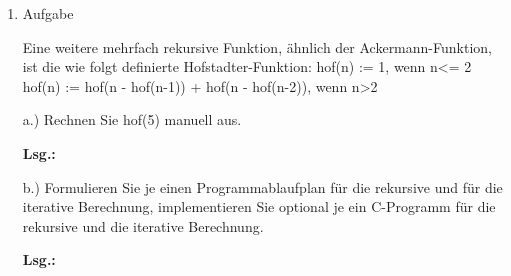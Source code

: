 \documentclass[12pt,a4paper]{scrreprt}
\newcommand{\Lsg}{\par \textbf{Lsg.: } \hfill}
\begin{document}
\begin{enumerate}

\item Aufgabe %

Eine weitere mehrfach rekursive Funktion, ähnlich der Ackermann-Funktion, ist die wie folgt definierte Hofstadter-Funktion:
hof(n) := 1, wenn n<= 2
hof(n) := hof(n - hof(n-1)) + hof(n - hof(n-2)), wenn n>2

a.) Rechnen Sie hof(5) manuell aus.

\Lsg

\begin{comment}
\end{comment}


b.) Formulieren Sie je einen Programmablaufplan für die rekursive und für die iterative Berechnung, implementieren Sie optional je ein C-Programm für die rekursive und die iterative Berechnung.

\Lsg

\begin{comment}
\end{comment}


\end{enumerate}
\end{document}
